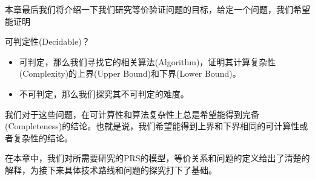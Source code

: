 本章最后我们将介绍一下我们研究等价验证问题的目标，给定一个问题，我们希望能证明
	 
可判定性(Decidable)？
	\begin{itemize}
		\item 可判定，那么我们寻找它的相关算法(Algorithm)，证明其计算复杂性(Complexity)的上界(Upper Bound)和下界(Lower Bound)。
		\item 不可判定，那么我们探究其不可判定的难度。
	\end{itemize}
我们对于这些问题，在可计算性和算法复杂性上总是希望能得到完备(Completeness)的结论。也就是说，我们希望能得到上界和下界相同的可计算性或者复杂性的结论。

在本章中，我们对所需要研究的PRS的模型，等价关系和问题的定义给出了清楚的解释，为接下来具体技术路线和问题的探究打下了基础。
